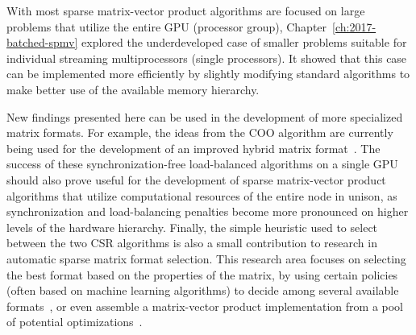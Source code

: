 With most sparse matrix-vector product algorithms are focused on large
problems that utilize the entire GPU (processor group),
Chapter~\ref{ch:2017-batched-spmv} explored the underdeveloped case of smaller
problems suitable for individual streaming multiprocessors (single processors).
It showed that this case can be implemented more efficiently by slightly
modifying standard algorithms to make better use of the available memory
hierarchy.

New findings presented here can be used in the development of more specialized
matrix formats. For example, the ideas from the COO algorithm are currently
being used for the development of an improved hybrid matrix
format~\cite{hybrid}. The success of these synchronization-free load-balanced
algorithms on a single GPU should also prove useful for the development of
sparse matrix-vector product algorithms that utilize computational resources of
the entire node in unison, as synchronization and load-balancing penalties
become more pronounced on higher levels of the hardware hierarchy. Finally, the
simple heuristic used to select between the two CSR algorithms is also a small
contribution to research in automatic sparse matrix format selection. This
research area focuses on selecting the best format based on the properties of
the matrix, by using certain policies (often based on machine learning
algorithms) to decide among several available
formats~\cite{clspmv,gpu-selection}, or even assemble a matrix-vector product
implementation from a pool of potential optimizations~\cite{elafrou}.
